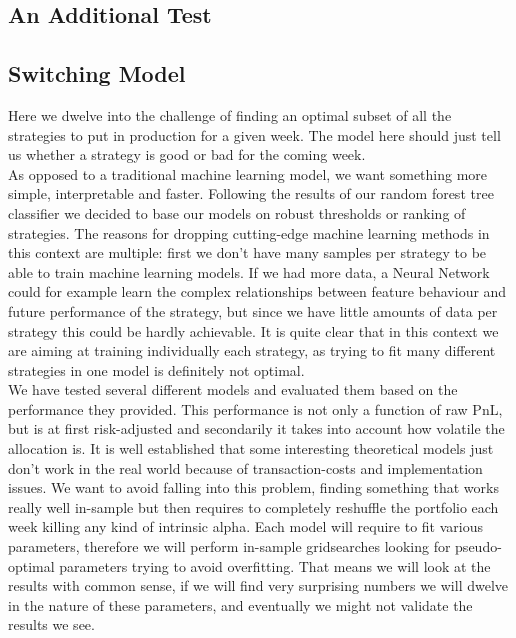 \documentclass[12pt]{article} %
\numberwithin{equation}{subsection}
\begin{document}



\subsection{An Additional Test}



\subsection{Switching Model}

Here we dwelve into the challenge of finding an optimal subset of all the strategies to put in production for a given week. The model here should just tell us whether a strategy is good or bad for the coming week.\\
As opposed to a traditional machine learning model, we want something more simple, interpretable and faster. Following the results of our random forest tree classifier we decided to base our models on robust thresholds or ranking of strategies. The reasons for dropping cutting-edge machine learning methods in this context are multiple: first we don't have many samples per strategy to be able to train machine learning models. If we had more data, a Neural Network could for example learn the complex relationships between feature behaviour and future performance of the strategy, but since we have little amounts of data per strategy this could be hardly achievable. It is quite clear that in this context we are aiming at training individually each strategy, as trying to fit many different strategies in one model is definitely not optimal.\\
We have tested several different models and evaluated them based on the performance they provided. This performance is not only a function of raw PnL, but is at first risk-adjusted and secondarily it takes into account how volatile the allocation is. It is well established that some interesting theoretical models just don't work in the real world because of transaction-costs and implementation issues. We want to avoid falling into this problem, finding something that works really well in-sample but then requires to completely reshuffle the portfolio each week killing any kind of intrinsic alpha.
Each model will require to fit various parameters, therefore we will perform in-sample gridsearches looking for pseudo-optimal parameters trying to avoid overfitting. That means we will look at the results with common sense, if we will find very surprising numbers we will dwelve in the nature of these parameters, and eventually we might not validate the results we see.\\
\end{document}
